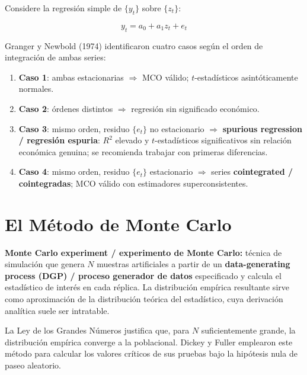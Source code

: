 \documentclass[12pt]{article}
\begin{document}
Considere la regresi\'on simple de $\{y_t\}$ sobre $\{z_t\}$:

\begin{equation}
  y_t = a_0 + a_1 z_t + e_t
\end{equation}

Granger y Newbold (1974) identificaron cuatro casos seg\'un el orden de
integraci\'on de ambas series:

\begin{enumerate}
  \item \textbf{Caso 1}: ambas estacionarias $\Rightarrow$ MCO v\'alido;
        $t$-estad\'isticos asint\'oticamente normales.
  \item \textbf{Caso 2}: \'ordenes distintos $\Rightarrow$ regresi\'on
        sin significado econ\'omico.
  \item \textbf{Caso 3}: mismo orden, residuo $\{e_t\}$ no estacionario
        $\Rightarrow$ \textbf{spurious regression / regresi\'on espuria}:
        $R^2$ elevado y $t$-estad\'isticos significativos sin relaci\'on
        econ\'omica genuina; se recomienda trabajar con primeras diferencias.
  \item \textbf{Caso 4}: mismo orden, residuo $\{e_t\}$ estacionario
        $\Rightarrow$ series \textbf{cointegrated / cointegradas}; MCO
        v\'alido con estimadores superconsistentes.
\end{enumerate}

\section{El M\'etodo de Monte Carlo}

\textbf{Monte Carlo experiment / experimento de Monte Carlo:} t\'ecnica de
simulaci\'on que genera $N$ muestras artificiales a partir de un
\textbf{data-generating process (DGP) / proceso generador de datos}
especificado y calcula el estad\'istico de inter\'es en cada r\'eplica.
La distribuci\'on emp\'irica resultante sirve como aproximaci\'on de la
distribuci\'on te\'orica del estad\'istico, cuya derivaci\'on anal\'itica
suele ser intratable.

La Ley de los Grandes N\'umeros justifica que, para $N$ suficientemente
grande, la distribuci\'on emp\'irica converge a la poblacional. Dickey y
Fuller emplearon este m\'etodo para calcular los valores cr\'iticos de sus
pruebas bajo la hip\'otesis nula de paseo aleatorio.
\end{document}
